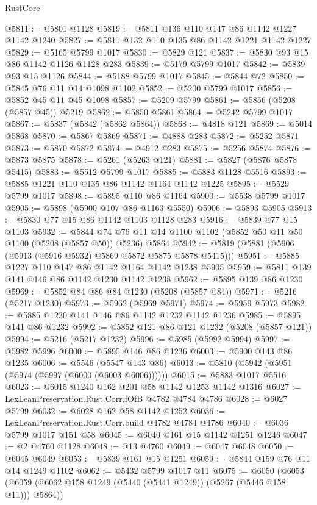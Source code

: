 \begin{lexlean}{RustCore}
\begin{coremodule}
@5811 := @5801 @1128
@5819 := @5811 @136 @110 @147 @86 @1142 @1227 @1142 @1240
@5827 := @5811 @132 @110 @135 @86 @1142 @1221 @1142 @1227
@5829 := @5165 @5799 @1017
@5830 := @5829 @121
@5837 := @5830 @93 @15 @86 @1142 @1126 @1128 @283
@5839 := @5179 @5799 @1017
@5842 := @5839 @93 @15 @1126
@5844 := @5188 @5799 @1017
@5845 := @5844 @72
@5850 := @5845 @76 @11 @14 @1098 @1102
@5852 := @5200 @5799 @1017
@5856 := @5852 @45 @11 @45 @1098
@5857 := @5209 @5799
@5861 := @5856 (@5208 (@5857 @45)) @5219
@5862 := @5850 @5861
@5864 := @5242 @5799 @1017
@5867 := @5837 (@5842 (@5862 @5864))
@5868 := @4818 @121
@5869 := @5014 @5868
@5870 := @5867 @5869
@5871 := @4888 @283
@5872 := @5252 @5871
@5873 := @5870 @5872
@5874 := @4912 @283
@5875 := @5256 @5874
@5876 := @5873 @5875
@5878 := @5261 (@5263 @121)
@5881 := @5827 (@5876 @5878 @5415)
@5883 := @5512 @5799 @1017
@5885 := @5883 @1128 @5516
@5893 := @5885 @1221 @110 @135 @86 @1142 @1164 @1142 @1225
@5895 := @5529 @5799 @1017
@5898 := @5895 @110 @86 @1164
@5900 := @5538 @5799 @1017
@5905 := @5898 (@5900 @107 @86 @1163 @5550)
@5906 := @5893 @5905
@5913 := @5830 @77 @15 @86 @1142 @1103 @1128 @283
@5916 := @5839 @77 @15 @1103
@5932 := @5844 @74 @76 @11 @14 @1100 @1102 (@5852 @50 @11 @50 @1100 (@5208 (@5857 @50)) @5236) @5864
@5942 := @5819 (@5881 (@5906 (@5913 (@5916 @5932) @5869 @5872 @5875 @5878 @5415)))
@5951 := @5885 @1227 @110 @147 @86 @1142 @1164 @1142 @1238 @5905
@5959 := @5811 @139 @141 @146 @86 @1142 @1230 @1142 @1238
@5962 := @5895 @139 @86 @1230
@5969 := @5852 @84 @86 @84 @1230 (@5208 (@5857 @84))
@5971 := @5216 (@5217 @1230)
@5973 := @5962 (@5969 @5971)
@5974 := @5959 @5973
@5982 := @5885 @1230 @141 @146 @86 @1142 @1232 @1142 @1236
@5985 := @5895 @141 @86 @1232
@5992 := @5852 @121 @86 @121 @1232 (@5208 (@5857 @121))
@5994 := @5216 (@5217 @1232)
@5996 := @5985 (@5992 @5994)
@5997 := @5982 @5996
@6000 := @5895 @146 @86 @1236
@6003 := @5900 @143 @86 @1235
@6006 := @5546 (@5547 @143 @86)
@6013 := @5810 (@5942 (@5951 (@5974 (@5997 (@6000 (@6003 @6006))))))
@6015 := @5883 @1017 @5516
@6023 := @6015 @1240 @162 @201 @58 @1142 @1253 @1142 @1316
@6027 := LexLeanPreservation.Rust.Corr.fOfB @4782 @4784 @4786
@6028 := @6027 @5799
@6032 := @6028 @162 @58 @1142 @1252
@6036 := LexLeanPreservation.Rust.Corr.build @4782 @4784 @4786
@6040 := @6036 @5799 @1017 @151 @58
@6045 := @6040 @161 @15 @1142 @1251 @1246
@6047 := @2 @4760 @1128
@6048 := @13 @4760
@6049 := @6047 @6048
@6050 := @6045 @6049
@6053 := @5839 @161 @15 @1251
@6059 := @5844 @159 @76 @11 @14 @1249 @1102
@6062 := @5432 @5799 @1017 @11
@6075 := @6050
    (@6053 (@6059 (@6062 @158 @1249 (@5440 (@5441 @1249)) (@5267 (@5446 @158 @11))) @5864))

\end{coremodule}
\end{lexlean}
